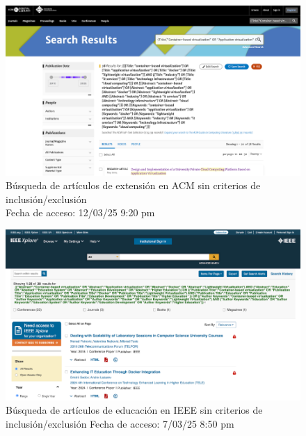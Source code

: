 \FloatBarrier\begin{figure}[H]
    \centering
    \includegraphics[width=\textwidth,keepaspectratio]{apendices/BD/sin-criterios/ACM-ind.png}
    \caption{Búsqueda de artículos de extensión en ACM sin criterios de inclusión/exclusión \\
    Fecha de acceso: 12/03/25 9:20 pm
    }\label{fig:busqueda3}
\end{figure}
\FloatBarrier\begin{figure}[H]
    \centering
    \includegraphics[width=\textwidth,keepaspectratio]{apendices/BD/sin-criterios/IEEE-ed.png}
    \caption{Búsqueda de artículos de educación en IEEE sin criterios de inclusión/exclusión
    Fecha de acceso: 7/03/25 8:50 pm
    }\label{fig:busqueda4}
\end{figure}
